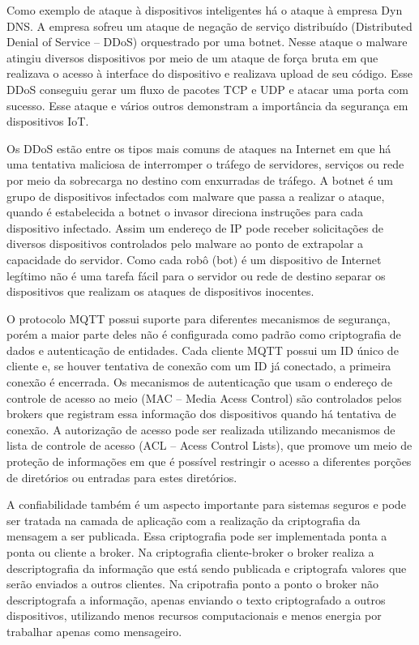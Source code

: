\documentclass[12pt, a4paper]{article}
\begin{document}
    Como exemplo de ataque à dispositivos inteligentes há o ataque à empresa Dyn DNS. A empresa sofreu um ataque de negação de serviço distribuído (Distributed Denial of Service – DDoS) orquestrado por uma botnet. Nesse ataque o malware atingiu diversos dispositivos por meio de um ataque de força bruta em que realizava o acesso à interface do dispositivo e realizava upload de seu código. Esse DDoS conseguiu gerar um fluxo de pacotes TCP e UDP e atacar uma porta com sucesso. Esse ataque e vários outros demonstram a importância da segurança em dispositivos IoT.
    \cite{MQTT_Vunerabilities, DDoS}
    
    Os DDoS estão entre os tipos mais comuns de ataques na Internet em que há uma tentativa maliciosa de interromper o tráfego de servidores, serviços ou rede por meio da sobrecarga no destino com enxurradas de tráfego. A botnet é um grupo de dispositivos infectados com malware que passa a realizar o ataque, quando é estabelecida a botnet o invasor direciona instruções para cada dispositivo infectado. Assim um endereço de IP pode receber solicitações de diversos dispositivos controlados pelo malware ao ponto de extrapolar a capacidade do servidor. Como cada robô (bot) é um dispositivo de Internet legítimo não é uma tarefa fácil para o servidor ou rede de destino separar os dispositivos que realizam os ataques de dispositivos inocentes.
    \cite{DDoS, Botnet}
    
    O protocolo MQTT possui suporte para diferentes mecanismos de segurança, porém a maior parte deles não é configurada como padrão como criptografia de dados e autenticação de entidades. Cada cliente MQTT possui um ID único de cliente e, se houver tentativa de conexão com um ID já conectado, a primeira conexão é encerrada. Os mecanismos de autenticação que usam o endereço de controle de acesso ao meio (MAC – Media Acess Control) são controlados pelos brokers que registram essa informação dos dispositivos quando há tentativa de conexão. A autorização de acesso pode ser realizada utilizando mecanismos de lista de controle de acesso (ACL – Acess Control Lists), que promove um meio de proteção de informações em que é possível restringir o acesso a diferentes porções de diretórios ou entradas para estes diretórios.
    \cite{MQTT_Vunerabilities, Acess_Control_Lists}
    
    A confiabilidade também é um aspecto importante para sistemas seguros e pode ser tratada na camada de aplicação com a realização da criptografia da mensagem a ser publicada. Essa criptografia pode ser implementada ponta a ponta ou cliente a broker. Na criptografia cliente-broker o broker realiza a descriptografia da informação que está sendo publicada e criptografa valores que serão enviados a outros clientes. Na cripotrafia ponto a ponto o broker não descriptografa a informação, apenas enviando o texto criptografado a outros dispositivos, utilizando menos recursos computacionais e menos energia por trabalhar apenas como mensageiro. 
    \cite{MQTT_Vunerabilities}
    
\end{document}
